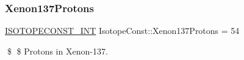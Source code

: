 \subsubsection{\texorpdfstring{Xenon137\+Protons}{Xenon137Protons}}
{\footnotesize\ttfamily \mbox{\hyperlink{group___isotope_const-_macros_ga5f18360b3e99483a35c32d789e62621c}{I\+S\+O\+T\+O\+P\+E\+C\+O\+N\+S\+T\+\_\+\+I\+NT}} Isotope\+Const\+::\+Xenon137\+Protons = 54}

\$ \$ Protons in Xenon-\/137. 